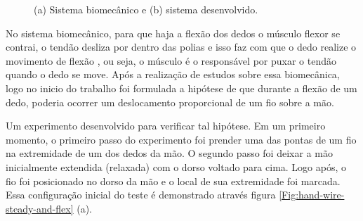 \documentclass[
	12pt,				%
	openright,			%
	oneside,			%
	a4paper,			%
	english,			%
	brazil				%
	]{abntex2}
\begin{document}
	\begin{figure}[!htb]
		 \centering
		 \caption{(a) Sistema biomecânico e (b) sistema desenvolvido.} 
		 \centering
		 \label{Fig:bio-and-system}
	\end{figure}

		No sistema biomecânico, para que haja a flexão dos dedos o músculo flexor se contrai, o tendão desliza por dentro das polias e isso faz com que o dedo realize o movimento de flexão \cite{drricardocirurgiao}, ou seja, o músculo é o responsável por puxar o tendão quando o dedo se move. Após a realização de estudos sobre essa biomecânica, logo no inicio do trabalho foi formulada a hipótese de que durante a flexão de um dedo, poderia ocorrer um deslocamento proporcional de um fio sobre a mão. 
		
		Um experimento desenvolvido para verificar tal hipótese. Em um primeiro momento, o primeiro passo do experimento foi prender uma das pontas de um fio na extremidade de um dos dedos da mão. O segundo passo foi deixar a mão inicialmente extendida (relaxada) com o dorso voltado para cima. Logo após, o fio foi posicionado no dorso da mão e o local de sua extremidade foi marcada. Essa configuração inicial do teste é demonstrado através figura \ref{Fig:hand-wire-steady-and-flex} (a).
\end{document}

